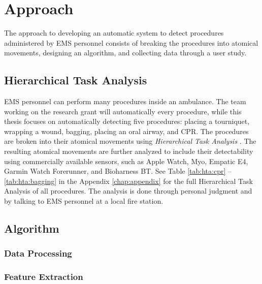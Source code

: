 
\chapter{Approach}
\label{ch:Approach}
The approach to developing an automatic system to detect procedures administered by EMS personnel consists of breaking the procedures into atomical movements, designing an algorithm, and collecting data through a user study.

\section{Hierarchical Task Analysis}
\label{sec:Approach:Hierarchical-Task-Analysis}
EMS personnel can perform many procedures inside an ambulance. The team working on the research grant will automatically every procedure, while this thesis focuses on automatically detecting five procedures: placing a tourniquet, wrapping a wound, bagging, placing an oral airway, and \gls{CPR}. The procedures are broken into their atomical movements using \emph{Hierarchical Task Analysis} \cite{kirwan1992guide}. The resulting atomical movements are further analyzed to include their detectability using commercially available sensors, such as Apple Watch, Myo, Empatic E4, Garmin Watch Forerunner, and Bioharness BT. See Table \ref{tab:hta:cpr} -- \ref{tab:hta:bagging} in the Appendix \ref{chap:appendix} for the full Hierarchical Task Analysis of all procedures. The analysis is done through personal judgment and by talking to EMS personnel at a local fire station.

\section{Algorithm}
\label{sec:Approach:Algorithm}

\subsection{Data Processing}
\label{sec:Approach:Data-Processing}

\subsection{Feature Extraction}
\label{sec:Approach:Feature-Extraction}

